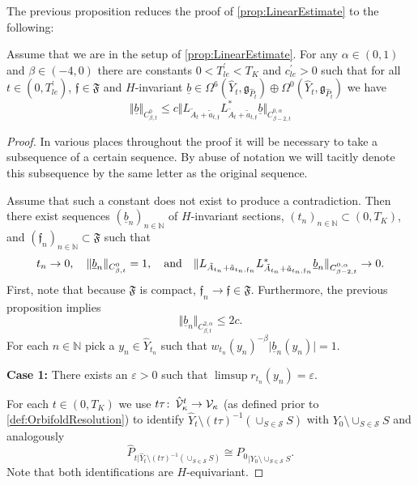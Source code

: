 \documentclass[11pt,a4paper]{scrartcl}
\newcommand{\col}{\colon \thinspace}
\newcommand{\VertWCt}[3]{\Vert_{C^{{#1}}_{{#2},t}{#3}}}
\newcommand{\VertWHt}[3]{\Vert_{C^{{#1},\alpha}_{{#2},t}{#3}}}
\numberwithin{equation}{section}
\theoremstyle{plain}
\theoremstyle{definition}
\theoremstyle{remark}
\begin{document}
The previous proposition reduces the proof of \autoref{prop:LinearEstimate} to the following:
\begin{proposition}
Assume that we are in the setup of \autoref{prop:LinearEstimate}. For any $\alpha\in (0,1)$ and $\beta \in (-4,0)$ there are constants $0<T_{le}^\prime <T_K$ and $c_{le}^\prime>0$ such that for all $t \in (0,T^\prime_{le})$, $\mathfrak{f} \in \mathfrak{F}$ and $H$-invariant $\underline{b} \in \Omega^6(\hat{Y}_t,\mathfrak{g}_{\hat{P}_t}) \oplus \Omega^0(\hat{Y}_t,\mathfrak{g}_{\hat{P}_t})$ we have \[ \Vert \underline{b} \VertWCt{0}{\beta}{} \leq c \Vert L_{\tilde{A}_t+\tilde{a}_{t,\mathfrak{f}}}L_{\tilde{A}_t+\tilde{a}_{t,\mathfrak{f}}}^* \underline{b} \VertWHt{0}{\beta-2}{} \]
\end{proposition}
\begin{proof}
In various places throughout the proof it will be necessary to take a subsequence of a certain sequence. By abuse of notation we will tacitly denote this subsequence by the same letter as the original sequence. 

Assume that such a constant does not exist to produce a contradiction. Then there exist sequences $(\underline{b}_n)_{n\in \mathbb{N}}$ of $H$-invariant sections, $(t_n)_{n\in \mathbb{N}} \subset (0,T_K)$, and $(\mathfrak{f}_n)_{n\in\mathbb{N}}\subset \mathfrak{F}$ such that \[ t_n \to 0, \quad \Vert \underline{b}_n \VertWCt{0}{\beta}{} = 1, \quad \textup{and} \quad \Vert L_{\tilde{A}_{t_n}+\tilde{a}_{t_n,\mathfrak{f}_n}}L_{\tilde{A}_{t_n}+\tilde{a}_{t_n,\mathfrak{f}_n}}^* \underline{b}_n \VertWHt{0}{\beta-2}{} \to 0. \] First, note that because $\mathfrak{F}$ is compact, $\mathfrak{f}_n \to \mathfrak{f} \in \mathfrak{F}$. Furthermore, the previous proposition implies 
\begin{equation}\label{eq:linearEstimate_HölderBound}
\Vert \underline{b}_n \VertWHt{2}{\beta}{} \leq 2c.
\end{equation}
For each $n\in \mathbb{N}$ pick a $y_n \in \hat{Y}_{t_n}$ such that $w_{t_n}(y_n)^{-\beta}\vert \underline{b}_n (y_n)\vert = 1$. 


\noindent \textbf{Case 1:} There exists an $\varepsilon>0$ such that $\limsup r_{t_n}(y_n)= \varepsilon$.

For each $t\in (0,T_K)$ we use $t\tau \col \hat{\mathcal{V}}_{\kappa}^t \to \mathcal{V}_{\kappa}$ (as defined prior to \autoref{def:OrbifoldResolution}) to identify $\hat{Y}_t \setminus (t\tau)^{-1}(\cup_{S\in \mathcal{S}} S )$ with $Y_0 \setminus \cup_{S \in \mathcal{S}} S$ and analogously \[\hat{P}_{t\vert \hat{Y}_t \setminus (t\tau)^{-1}(\cup_{S\in \mathcal{S}} S)} \cong {P_0}_{\vert Y_0 \setminus \cup_{S \in \mathcal{S}} S}.\] Note that both identifications are $H$-equivariant. 


\end{proof}
\end{document}

